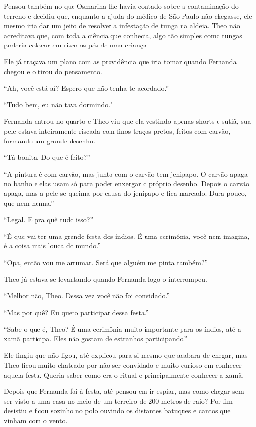 Pensou também no que Osmarina lhe havia contado sobre a contaminação do
terreno e decidiu que, enquanto a ajuda do médico de São Paulo não
chegasse, ele mesmo iria dar um jeito de resolver a infestação de tunga
na aldeia. Theo não acreditava que, com toda a ciência que conhecia,
algo tão simples como tungas poderia colocar em risco os pés de uma
criança.

Ele já traçava um plano com as providência que iria tomar quando
Fernanda chegou e o tirou do pensamento.

``Ah, você está aí? Espero que não tenha te acordado.''

``Tudo bem, eu não tava dormindo.''

Fernanda entrou no quarto e Theo viu que ela vestindo apenas shorts e
sutiã, sua pele estava inteiramente riscada com finos traços pretos,
feitos com carvão, formando um grande desenho.

``Tá bonita. Do que é feito?''

``A pintura é com carvão, mas junto com o carvão tem jenipapo. O carvão
apaga no banho e elas usam só para poder enxergar o próprio desenho.
Depois o carvão apaga, mas a pele se queima por causa do jenipapo e fica
marcado. Dura pouco, que nem henna.''

``Legal. E pra quê tudo isso?''

``É que vai ter uma grande festa dos índios. É uma cerimônia, você nem
imagina, é a coisa mais louca do mundo.''

``Opa, então vou me arrumar. Será que alguém me pinta também?''

Theo já estava se levantando quando Fernanda logo o interrompeu.

``Melhor não, Theo. Dessa vez você não foi convidado.''

``Mas por quê? Eu quero participar dessa festa.''

``Sabe o que é, Theo? É uma cerimônia muito importante para os índios,
até a xamã participa. Eles não gostam de estranhos participando.''

Ele fingiu que não ligou, até explicou para si mesmo que acabara de
chegar, mas Theo ficou muito chateado por não ser convidado e muito
curioso em conhecer aquela festa. Queria saber como era o ritual e
principalmente conhecer a xamã.

Depois que Fernanda foi à festa, até pensou em ir espiar, mas como
chegar sem ser visto a uma casa no meio de um terreiro de 200 metros de
raio? Por fim desistiu e ficou sozinho no polo ouvindo os distantes
batuques e cantos que vinham com o vento.

